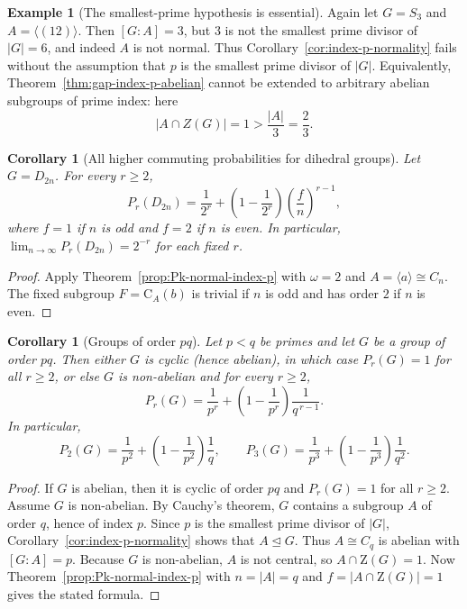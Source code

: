 \documentclass[11pt]{article}
\newtheorem{corollary}[theorem]{Corollary}
\theoremstyle{definition}
\theoremstyle{remark}
\theoremstyle{definition}
\newtheorem{example}[theorem]{Example}
\theoremstyle{plain}
\newcommand{\Z}{\mathrm{Z}}
\newcommand{\C}{\mathrm{C}}
\begin{document}
\begin{example}[The smallest-prime hypothesis is essential]\label{ex:index-p-not-normal}
Again let $G=S_3$ and $A=\langle(12)\rangle$.
Then $[G:A]=3$, but $3$ is not the smallest prime divisor of $|G|=6$, and indeed $A$ is not normal.
Thus Corollary~\ref{cor:index-p-normality} fails without the assumption that $p$ is the smallest prime divisor of $|G|$.
Equivalently, Theorem~\ref{thm:gap-index-p-abelian} cannot be extended to arbitrary abelian subgroups of prime index:
here
\[
|A\cap Z(G)|=1>\frac{|A|}{3}=\frac23.
\]
\end{example}

\begin{corollary}[All higher commuting probabilities for dihedral groups]\label{cor:dihedral-all-Pr}
Let $G=D_{2n}$. For every $r\ge 2$,
\[
P_r(D_{2n})
=\frac{1}{2^r}+\left(1-\frac{1}{2^r}\right)\left(\frac{f}{n}\right)^{r-1},
\]
where $f=1$ if $n$ is odd and $f=2$ if $n$ is even.
In particular, $\lim_{n\to\infty}P_r(D_{2n})=2^{-r}$ for each fixed $r$.
\end{corollary}

\begin{proof}
Apply Theorem~\ref{prop:Pk-normal-index-p} with $\omega=2$ and $A=\langle a\rangle\cong C_n$.
The fixed subgroup $F=\C_A(b)$ is trivial if $n$ is odd and has order $2$ if $n$ is even.
\end{proof}

\begin{corollary}[Groups of order $pq$]\label{cor:order-pq}
Let $p<q$ be primes and let $G$ be a group of order $pq$.
Then either $G$ is cyclic (hence abelian), in which case $P_r(G)=1$ for all $r\ge 2$,
or else $G$ is non-abelian and for every $r\ge 2$,
\[
P_r(G)=\frac{1}{p^r}+\left(1-\frac{1}{p^r}\right)\frac{1}{q^{\,r-1}}.
\]
In particular,
\[
P_2(G)=\frac{1}{p^2}+\left(1-\frac{1}{p^2}\right)\frac{1}{q},
\qquad
P_3(G)=\frac{1}{p^3}+\left(1-\frac{1}{p^3}\right)\frac{1}{q^{2}}.
\]
\end{corollary}

\begin{proof}
If $G$ is abelian, then it is cyclic of order $pq$ and $P_r(G)=1$ for all $r\ge 2$.
Assume $G$ is non-abelian.
By Cauchy's theorem, $G$ contains a subgroup $A$ of order $q$, hence of index $p$.
Since $p$ is the smallest prime divisor of $|G|$, Corollary~\ref{cor:index-p-normality} shows that $A\trianglelefteq G$.
Thus $A\cong C_q$ is abelian with $[G:A]=p$.
Because $G$ is non-abelian, $A$ is not central, so $A\cap \Z(G)=1$.
Now Theorem~\ref{prop:Pk-normal-index-p} with $n=|A|=q$ and $f=|A\cap \Z(G)|=1$ gives the stated formula.
\end{proof}
\end{document}
